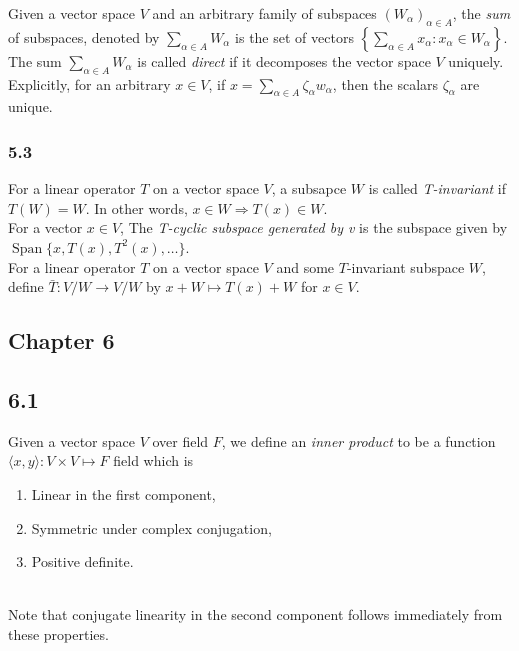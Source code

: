 \documentclass{article}
\DeclareMathOperator{\Span}{Span}
\begin{document}
Given a vector space $V$ and an arbitrary family of subspaces $(W_{\alpha})_{\alpha \in A}$, the \textit{sum} of subspaces, denoted by $\sum_{\alpha \in A} W_\alpha$ is the set of vectors $\left\{\sum_{\alpha \in A} x_\alpha: x_\alpha \in W_\alpha\right\}$. \\

The sum $\sum_{\alpha \in A} W_\alpha$ is called \textit{direct} if it decomposes the vector space $V$ uniquely. Explicitly, for an arbitrary $x \in V$, if
$x = \sum_{\alpha \in A} \zeta_\alpha w_\alpha$, then the scalars $\zeta_\alpha$ are unique. \\

\subsubsection*{5.3}

For a linear operator $T$ on a vector space $V$, a subsapce $W$ is called \textit{T-invariant} if $T(W)=W$. In other words,  $x \in W \Rightarrow T(x) \in W$. \\

For a vector $x \in V$, The \textit{T-cyclic subspace generated by v} is the subspace given by $\Span\{x, T(x), T^2(x), \ldots \}$. \\

For a linear operator $T$ on a vector space $V$ and some $T$-invariant subspace $W$, define $\bar{T}: V/W \rightarrow V/W$ by $x+W \mapsto T(x)+W$ for $x \in V$.  

\subsection*{Chapter 6}
\subsection*{6.1}

Given a vector space $V$ over field $F$, we define an \textit{inner product} to be a function $\langle x, y\rangle: V \times V \mapsto F$  field which is 
\begin{enumerate}
\item Linear in the first component,
\item Symmetric under complex conjugation,
\item Positive definite.
\end{enumerate} \\

Note that conjugate linearity in the second component follows immediately from these properties. 
\end{document}
